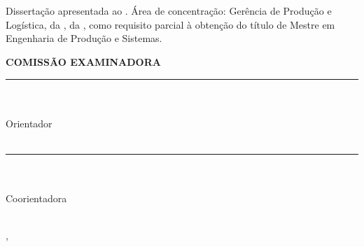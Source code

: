 \begin{center}
    {\MakeUppercase{\textbf{\aluno}} \\ [1cm]

    \MakeUppercase{\textbf{\titulo}} \\ [1cm]

    \hspace{.45\textwidth} %
        \begin{minipage}{.5\textwidth}
        \noindent Dissertação apresentada ao \curso. Área de concentração: Gerência de Produção e Logística, da \departamento, da \universidade, como requisito parcial à obtenção do título de Mestre em Engenharia de Produção e Sistemas. \\ [5mm]
        \end{minipage}
    \textbf{COMISSÃO EXAMINADORA} \\ [1cm]
    
    \rule{10cm}{.1mm} \\ \orientador \\ Orientador\\ \universidade \\ [10mm]

    \rule{10cm}{.1mm} \\ \coorientador \\ Coorientadora \\ \universidade \\ [10mm]

    
    
    \vfill
    
    \cidade, \datadefesa
    }
\end{center}
